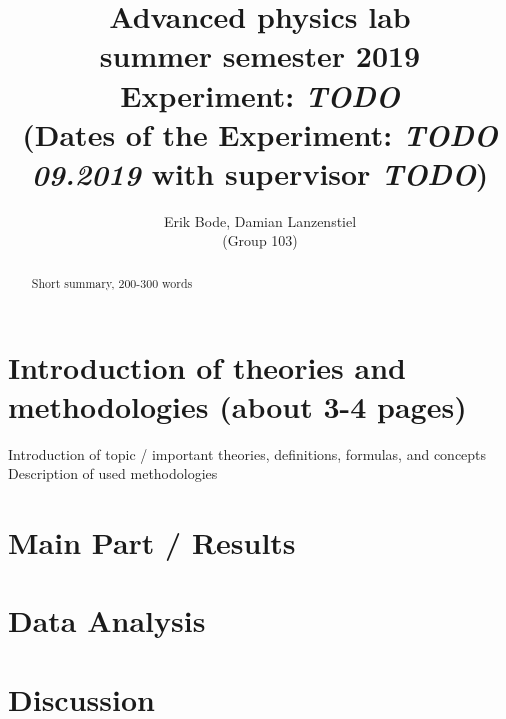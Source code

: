 \documentclass[titlepage,11pt,a4paper]{article}
\begin{document}
	\title{
		\large Advanced physics lab\\
		summer semester 2019 \\[4mm]
		\textbf{\LARGE 
			Experiment: \emph{TODO}
		} \\[3mm]
		(Dates of the Experiment: \emph{TODO 09.2019} with supervisor \emph{\textsl{TODO}}) \\}
	\author{Erik Bode, Damian Lanzenstiel \\ (Group 103)}
	\maketitle
	\begin{abstract}
		Short summary, 200-300 words
	\end{abstract}
	\tableofcontents
	\listoffigures
	\listoftables

\section{Introduction of theories and methodologies (about 3-4 pages)}
Introduction of topic / important theories, definitions, formulas, and concepts
Description of used methodologies
\section{Main Part / Results}
\section{Data Analysis}
\section{Discussion}
\end{document}
